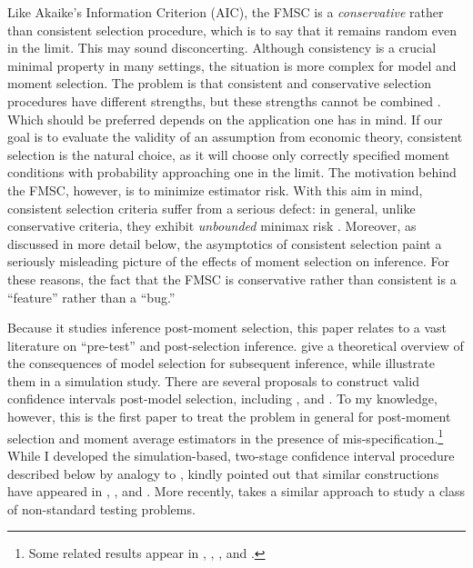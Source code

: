 Like Akaike's Information Criterion (AIC), the FMSC is a \emph{conservative} rather than consistent selection procedure, which is to say that it remains random even in the limit.	
This may sound disconcerting.
Although consistency is a crucial minimal property in many settings, the situation is more complex for model and moment selection.
The problem is that consistent and conservative selection procedures have different strengths, but these strengths cannot be combined \cite{Yang2005}.
Which should be preferred depends on the application one has in mind.
If our goal is to evaluate the validity of an assumption from economic theory, consistent selection is the natural choice, as it will choose only correctly specified moment conditions with probability approaching one in the limit.
The motivation behind the FMSC, however, is to minimize estimator risk.
With this aim in mind, consistent selection criteria suffer from a serious defect: in general, unlike conservative criteria, they exhibit \emph{unbounded} minimax risk \citep{LeebPoetscher2008}.
Moreover, as discussed in more detail below, the asymptotics of consistent selection paint a seriously misleading picture of the effects of moment selection on inference.
For these reasons, the fact that the FMSC is conservative rather than consistent is a ``feature'' rather than a ``bug.''

Because it studies inference post-moment selection, this paper relates to a vast literature on ``pre-test'' and post-selection inference.
\citet{LeebPoetscher2005, LeebPoetscher2009} give a theoretical overview of the consequences of model selection for subsequent inference, while \cite{Demetrescu} illustrate them in a simulation study. 
There are several proposals to construct valid confidence intervals post-model selection, including \cite{Kabaila1998}, \cite{HjortClaeskens} and \cite{KabailaLeeb2006}. 
To my knowledge, however, this is the first paper to treat the problem in general for post-moment selection and moment average estimators in the presence of mis-specification.\footnote{Some related results appear in \cite{Berkowitz}, \cite{Guggenberger2010}, \cite{Guggenberger2012}, and \cite{GuggenbergerKumar}.}
While I developed the simulation-based, two-stage confidence interval procedure described below by analogy to \cite{ClaeskensHjortbook}, \cite{Leeb} kindly pointed out that similar constructions have appeared in \cite{Loh1985}, \cite{Berger1994}, and \cite{Silvapulle1996}. More recently, \cite{McCloskey} takes a similar approach to study a class of non-standard testing problems.

